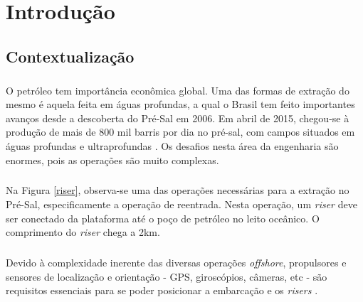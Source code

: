  


\chapter{Introdução}

\label{CapIntro}



\section{Contextualização}

\paragraph{} O petróleo tem importância econômica global. Uma das formas de extração do mesmo é aquela feita em águas profundas, a qual o Brasil tem feito importantes avanços desde a descoberta do Pré-Sal em 2006. Em abril de 2015, chegou-se à produção de mais de 800 mil barris por dia no pré-sal, com campos situados em águas profundas e ultraprofundas \cite{preSal}. Os desafios nesta área da engenharia são enormes, pois as operações são muito complexas.

\paragraph{} Na Figura \ref{riser}, observa-se uma das operações necessárias para a extração no Pré-Sal, especificamente a operação de reentrada. Nesta operação, um \textit{riser} deve ser conectado da plataforma até o poço de petróleo no leito oceânico. O comprimento do \textit{riser} chega a 2km.

\paragraph{} Devido à complexidade inerente das diversas operações \textit{offshore}, propulsores e sensores de localização e orientação - GPS, giroscópios, câmeras, etc - são requisitos essenciais para se poder posicionar a embarcação e os \textit{risers} \cite{redytton}.

